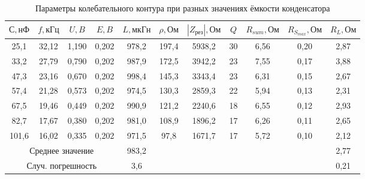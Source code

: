 \documentclass[a4paper, 12pt]{article}
\begin{document}
\begin{table}[h!]
\begin{center}
\begin{tabular}{|cccc|c|c|c|c|c|c|c|}
\hline
\multicolumn{1}{|c|}{$С, нФ$} & \multicolumn{1}{c|}{$f, кГц$} & \multicolumn{1}{c|}{$U, B$}  & $E, B$  & $L, мкГн$ & $\rho, Ом$ & $|Z_{рез}|, Ом$ & $Q$  & $R_{sum}, Ом$ & $R_{S_{max}}, Ом$ & $R_L, Ом$ \\ \hline
\multicolumn{1}{|c|}{25,1}  & \multicolumn{1}{c|}{32,12}  & \multicolumn{1}{c|}{1,190} & 0,202 & 978,2   & 197,4   & 5938,2     & 30 & 6,56     & 0,20      & 2,87     \\ \hline
\multicolumn{1}{|c|}{33,2}  & \multicolumn{1}{c|}{27,79}  & \multicolumn{1}{c|}{0,790} & 0,202 & 987,9   & 172,5   & 3942,2     & 23 & 7,55     & 0,17      & 3,88     \\ \hline
\multicolumn{1}{|c|}{47,3}  & \multicolumn{1}{c|}{23,16}  & \multicolumn{1}{c|}{0,670} & 0,202 & 998,4   & 145,3   & 3343,4     & 23 & 6,31     & 0,15      & 2,67     \\ \hline
\multicolumn{1}{|c|}{57,4}  & \multicolumn{1}{c|}{21,28}  & \multicolumn{1}{c|}{0,573} & 0,202 & 974,5   & 130,3   & 2859,3     & 22 & 5,94     & 0,13      & 2,31     \\ \hline
\multicolumn{1}{|c|}{67,5}  & \multicolumn{1}{c|}{19,46}  & \multicolumn{1}{c|}{0,449} & 0,202 & 990,9   & 121,2   & 2240,6     & 18 & 6,55     & 0,12      & 2,93     \\ \hline
\multicolumn{1}{|c|}{82,7}  & \multicolumn{1}{c|}{17,67}  & \multicolumn{1}{c|}{0,380} & 0,202 & 981,0   & 108,9   & 1896,2     & 17 & 6,26     & 0,11      & 2,65     \\ \hline
\multicolumn{1}{|c|}{101,6} & \multicolumn{1}{c|}{16,02}  & \multicolumn{1}{c|}{0,335} & 0,202 & 971,5   & 97,8    & 1671,7     & 17 & 5,72     & 0,10      & 2,12     \\ \hline
\multicolumn{4}{|c|}{Среднее значение}                                                         & 983,2   &         &            &    &          &           & 2,77     \\ \hline
\multicolumn{4}{|c|}{Случ. погрешность}                                                        & 3,6     &         &            &    &          &           & 0,21     \\ \hline
\end{tabular}
\end{center}
\caption{Параметры колебательного контура при разных значениях ёмкости конденсатора}
\label{tab1}
\end{table}
\end{document}
